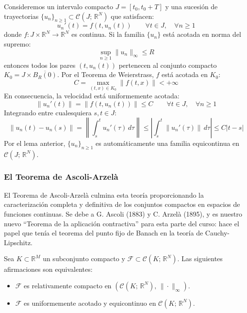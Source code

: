 \begin{observación}
    Consideremos un intervalo compacto $J = [t_0, t_0 + T]$ y una sucesión de trayectorias $\{u_n\}_{n \geq 1} \subset \mathcal{C}(J; \, \mathbb{R}^N)$ que satisfacen:
    \[
        u_n'(t) = f(t, u_n(t)) \qquad \forall t \in J, \quad \forall n \geq 1
    \]
    donde $f: J \times \mathbb{R}^N \to \mathbb{R}^N$ es continua. Si la familia $\{u_n\}$ está acotada en norma del supremo:
    \[
        \sup_{n \geq 1} \|u_n\|_\infty \leq R
    \]
    entonces todos los pares $(t, u_n(t))$ pertenecen al conjunto compacto $K_0 = J \times \overline{B_R(0)}$. Por el Teorema de Weierstrass, $f$ está acotada en $K_0$:
    \[
        C = \max_{(t, x) \in K_0} \|f(t, x)\| < +\infty
    \]
    En consecuencia, la velocidad está uniformemente acotada:
    \[
        \|u_n'(t)\| = \|f(t, u_n(t))\| \leq C \qquad \forall t \in J, \quad \forall n \geq 1
    \]
    Integrando entre cualesquiera $s, t \in J$:
    \[
        \|u_n(t) - u_n(s)\| = \left\| \int_s^t u_n'(\tau)\, d\tau \right\| \leq \left| \int_s^t \|u_n'(\tau)\|\, d\tau \right| \leq C |t - s|
    \]
    Por el lema anterior, $\{u_n\}_{n \geq 1}$ es automáticamente una familia equicontinua en $\mathcal{C}(J; \, \mathbb{R}^N)$.
\end{observación}

\subsubsection{El Teorema de Ascoli-Arzelà}

El Teorema de Ascoli-Arzelà culmina esta teoría proporcionando la caracterización completa y definitiva de los conjuntos compactos en espacios de funciones continuas. Se debe a G. Ascoli (1883) y C. Arzelà (1895), y es nuestro nuevo ``Teorema de la aplicación contractiva'' para esta parte del curso: hace el papel que tenía el teorema del punto fijo de Banach en la teoría de Cauchy-Lipschitz.

\begin{teorema}
    Sea $K \subset \mathbb{R}^M$ un subconjunto compacto y $\mathcal{F} \subset \mathcal{C}(K; \, \mathbb{R}^N)$. Las siguientes afirmaciones son equivalentes:
    \begin{itemize}
        \item $\mathcal{F}$ es relativamente compacto en $(\mathcal{C}(K; \, \mathbb{R}^N), \, \|\cdot\|_\infty)$.
        \item $\mathcal{F}$ es uniformemente acotado y equicontinuo en $\mathcal{C}(K; \, \mathbb{R}^N)$.
    \end{itemize}
\end{teorema}


